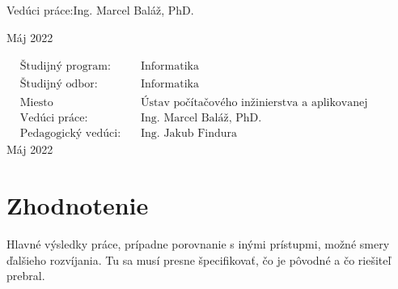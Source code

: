 \documentclass[12pt, a4paper, twoside, openright, slovak]{book}
\newcommand{\emptypage}{\newpage\thispagestyle{empty}\mbox{}\newpage}
\newcommand{\Supervisor}[0] {Ing. Marcel Baláž, PhD.}
\newcommand{\PedagogicalSupervisor}[0] {Ing. Jakub Findura}
\newcommand{\Date}[0] {Máj 2022}
\newcommand{\StudyProgramme}[0] {Informatika}
\newcommand{\StudyField}[0] {Informatika}
\newcommand{\Institute}[0] {Ústav počítačového inžinierstva a aplikovanej informatiky}
\begin{document}

\begin{flushleft}
Vedúci práce:\quad \Supervisor{\Large \par}
\vspace{\medskipamount}
\Date
\end{flushleft}

\emptypage


\begin{flushleft}
{\setlength{\mathindent}{0.1cm}
\begin{align*}
& \text{Študijný program:} && \text{\StudyProgramme} \\
& \text{Študijný odbor:} && \text{\StudyField} \\
& \text{Miesto vypracovania:} && \text{\Institute} \\
& \text{Vedúci práce:} && \text{\Supervisor} \\
& \text{Pedagogický vedúci:} && \text{\PedagogicalSupervisor}
\end{align*}}
\vspace{2\bigskipamount}
\Date
\end{flushleft}

\emptypage

\newpage
\thispagestyle{empty}

\newpage

\emptypage
{}





\renewcommand{\contentsname}{Obsah}
\thispagestyle{empty}
\tableofcontents{}
\emptypage








\chapter{Zhodnotenie}
Hlavné výsledky práce, prípadne porovnanie s inými prístupmi, možné smery ďalšieho rozvíjania.
Tu sa musí presne špecifikovať, čo je pôvodné a čo riešiteľ prebral.
\emptypage


\nocite{*}
\printbibliography[title={Literatúra}]

\appendix
{}
\end{document}
